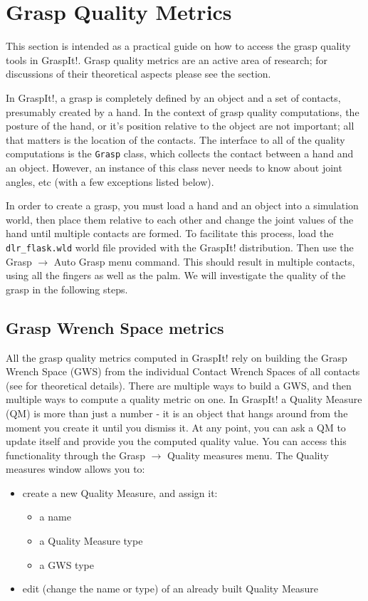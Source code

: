 \section{Grasp Quality Metrics}
\label{sec:quality}


This section is intended as a practical guide on how to access the
grasp quality tools in GraspIt!. Grasp quality metrics are an active
area of research; for discussions of their theoretical aspects please
see the  section.

In GraspIt!, a grasp is completely defined by an object and a set of
contacts, presumably created by a hand. In the context of grasp
quality computations, the posture of the hand, or it's position
relative to the object are not important; all that matters is the
location of the contacts. The interface to all of the quality
computations is the \texttt{Grasp} class, which collects the contact
between a hand and an object. However, an instance of this class never
needs to know about joint angles, etc (with a few exceptions listed
below).

In order to create a grasp, you must load a hand and an object into a
simulation world, then place them relative to each other and change
the joint values of the hand until multiple contacts are formed. To
facilitate this process, load the \texttt{dlr\_flask.wld} world file
provided with the GraspIt! distribution. Then use the Grasp $\rightarrow$ Auto
Grasp menu command. This should result in multiple contacts, using all
the fingers as well as the palm. We will investigate the quality of
the grasp in the following steps.

\subsection{Grasp Wrench Space metrics}

All the grasp quality metrics computed in GraspIt! rely on building
the Grasp Wrench Space (GWS) from the individual Contact Wrench Spaces
of all contacts (see  for
theoretical details). There are multiple ways to build a GWS, and then
multiple ways to compute a quality metric on one. In GraspIt! a
Quality Measure (QM) is more than just a number - it is an object that
hangs around from the moment you create it until you dismiss it. At
any point, you can ask a QM to update itself and provide you the
computed quality value. You can access this functionality through the
Grasp $\rightarrow$ Quality measures menu. The Quality measures window allows you
to:
\begin{itemize}
\item create a new Quality Measure, and assign it:
\begin{itemize}
\item a name
\item a Quality Measure type
\item a GWS type
\end{itemize}
\item edit (change the name or type) of an already built Quality Measure
\end{itemize}

